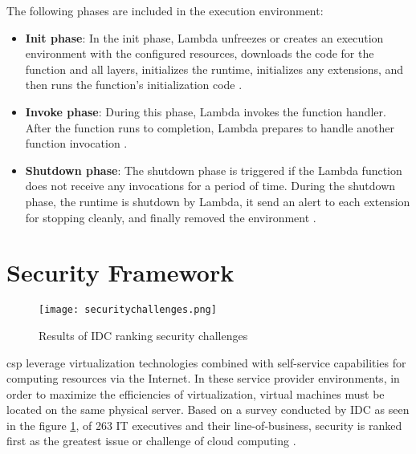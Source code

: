 \par The following phases are included in the execution
environment:
\begin{itemize}
    \item \textbf{Init phase}: In the init phase, Lambda unfreezes or creates an execution environment with the configured
    resources, downloads the code for the function and all layers, initializes the runtime, initializes any
    extensions, and then runs the function’s
    initialization code \cite{46}.
\end{itemize}
\begin{itemize}
    \item \textbf{Invoke phase}: During this phase, Lambda invokes the function handler. After the function runs to
    completion, Lambda prepares to handle another
    function invocation \cite{46}.
\end{itemize}
\begin{itemize}
    \item \textbf{Shutdown phase}: The shutdown phase is triggered if the Lambda function does not receive any invocations
    for a period of time.
    During the shutdown  phase, the runtime is shutdown
    by Lambda, it send an alert to each extension for
    stopping cleanly, and finally removed the environment \cite{46}.
\end{itemize}


\section{Security Framework}

\begin{figure}
    \centering
    \texttt{[image: securitychallenges.png]}
    \caption{Results of IDC ranking security
    challenges}{\cite{47}}
    \label{fig:securitychallenges}
\end{figure}

\par \gls{csp} leverage
virtualization technologies combined with self-service capabilities for computing resources via the Internet.
In these service provider environments, in order to maximize the efficiencies of virtualization, virtual machines must be located on the same physical server.
Based on a survey conducted by IDC as seen in the figure \ref{fig:securitychallenges}, of 263 IT executives and their line-of-business, security is ranked first as the greatest issue or challenge of cloud computing \cite{47}.

